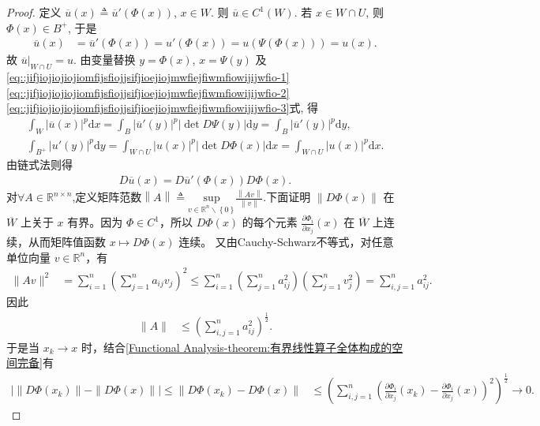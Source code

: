 \documentclass[../../main.tex]{subfiles}%
\begin{document}
\begin{proof}
定义 \(\overline{u}(x) \triangleq \overline{u}'(\Phi(x))\), \(x \in W\). 则 \(\overline{u} \in C^1(W)\). 若 \(x \in W \cap U\), 则 \(\Phi(x) \in B^+\), 于是
\begin{align*}
\overline{u}(x) &= \overline{u}'(\Phi(x)) = u'(\Phi(x)) = u(\Psi(\Phi(x))) = u(x).
\end{align*}
故 \(\overline{u}|_{W \cap U} = u\). 由变量替换 \(y = \Phi(x)\), \(x = \Psi(y)\) 及\eqref{eq::jifjiojiojiojiomfijsfiojjsifjioejiojmwfiejfiwmfiowijijwfio-1}\eqref{eq::jifjiojiojiojiomfijsfiojjsifjioejiojmwfiejfiwmfiowijijwfio-2}\eqref{eq::jifjiojiojiojiomfijsfiojjsifjioejiojmwfiejfiwmfiowijijwfio-3}式, 得
\begin{gather}
\int_W |\overline{u}(x)|^p \mathrm{d}x = \int_B |\overline{u}'(y)|^p |\det D\Psi(y)| \mathrm{d}y = \int_B |\overline{u}'(y)|^p \mathrm{d}y,\label{eq::jijioqwio93283r3r23}\\
\int_{B^+} |u'(y)|^p \mathrm{d}y = \int_{W \cap U} |u(x)|^p |\det D\Phi(x)| \mathrm{d}x = \int_{W \cap U} |u(x)|^p \mathrm{d}x.\label{eq::jijioqwio93283r3r23-111}
\end{gather}
由链式法则得
\begin{align}
D\overline{u}(x) = D\overline{u}'(\Phi(x)) D\Phi(x). \label{eq:ch05-chain-rule-uv}
\end{align}
对$\forall A\in \mathbb{R}^{n\times n}$,定义矩阵范数$\left\| A \right\| \triangleq \underset{v\in \mathbb{R} ^n\backslash \left\{ 0 \right\}}{\mathrm{sup}}\frac{\left\| Av \right\|}{\left\| v \right\|}$.下面证明 \(\|D\Phi(x)\|\) 在 \(\overline{W}\) 上关于 \(x\) 有界。因为 \(\Phi \in C^1\)，所以 \(D\Phi(x)\) 的每个元素 \(\frac{\partial \Phi_i}{\partial x_j}(x)\) 在 \(\overline{W}\) 上连续，从而矩阵值函数 \(x \mapsto D\Phi(x)\) 连续。
又由Cauchy-Schwarz不等式，对任意单位向量 \(v \in \mathbb{R}^n\)，有
\begin{align*}
\|Av\|^2 &= \sum_{i=1}^n \left( \sum_{j=1}^n a_{ij} v_j \right)^2 \leqslant \sum_{i=1}^n \left( \sum_{j=1}^n a_{ij}^2 \right) \left( \sum_{j=1}^n v_j^2 \right) = \sum_{i,j=1}^n a_{ij}^2.
\end{align*}
因此
\begin{align*}
\|A\| &\leqslant \left( \sum_{i,j=1}^n a_{ij}^2 \right)^{\frac{1}{2}}.
\end{align*}
于是当 \(x_k \to x\) 时，结合\cref{Functional Analysis-theorem:有界线性算子全体构成的空间完备}有
\begin{align*}
\bigl| \|D\Phi(x_k)\| - \|D\Phi(x)\| \bigr| \leqslant \|D\Phi(x_k) - D\Phi(x)\| &\leqslant \left( \sum_{i,j=1}^n \left( \frac{\partial \Phi_i}{\partial x_j}(x_k) - \frac{\partial \Phi_i}{\partial x_j}(x) \right)^2 \right)^{\frac{1}{2}} \to 0.

\end{align*}
\end{proof}
\end{document}
